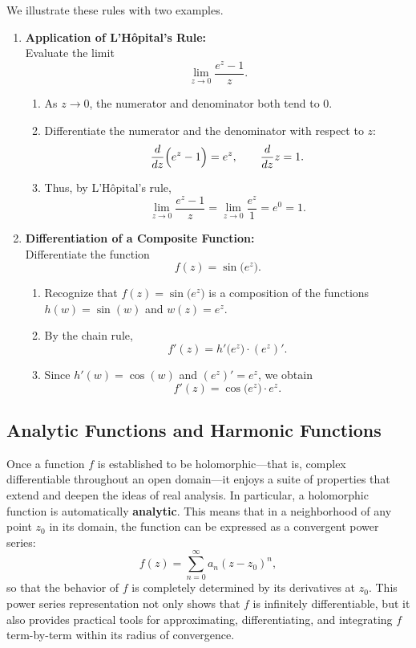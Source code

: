 \exampleline
\begin{example}
We illustrate these rules with two examples.

\begin{enumerate}
    \item \textbf{Application of L'Hôpital's Rule:}\\[1mm]
    Evaluate the limit 
    \[
    \lim_{z\to 0}\frac{e^z-1}{z}.
    \]
    \begin{enumerate}
        \item As \(z\to0\), the numerator and denominator both tend to 0.
        \item Differentiate the numerator and the denominator with respect to \(z\):
        \[
        \frac{d}{dz}\Bigl(e^z-1\Bigr)=e^z,\qquad \frac{d}{dz}z=1.
        \]
        \item Thus, by L'Hôpital's rule,
        \[
        \lim_{z\to 0}\frac{e^z-1}{z}=\lim_{z\to0}\frac{e^z}{1}=e^0=1.
        \]
    \end{enumerate}

    \bigskip

    \item \textbf{Differentiation of a Composite Function:}\\[1mm]
    Differentiate the function
    \[
    f(z)=\sin\bigl(e^z\bigr).
    \]
    \begin{enumerate}
        \item Recognize that \(f(z)=\sin\bigl(e^z\bigr)\) is a composition of the functions \(h(w)=\sin(w)\) and \(w(z)=e^z\).
        \item By the chain rule,
        \[
        f'(z)=h'\bigl(e^z\bigr)\cdot (e^z)'.
        \]
        \item Since \(h'(w)=\cos(w)\) and \((e^z)'=e^z\), we obtain
        \[
        f'(z)=\cos\bigl(e^z\bigr)\cdot e^z.
        \]
    \end{enumerate}
\end{enumerate}

\end{example}
\exampleline



\subsection*{Analytic Functions and Harmonic Functions}  

\noindent Once a function \(f\) is established to be holomorphic—that is, complex differentiable throughout an open domain—it enjoys a suite of properties that extend and deepen the ideas of real analysis. In particular, a holomorphic function is automatically \textbf{analytic}. This means that in a neighborhood of any point \(z_0\) in its domain, the function can be expressed as a convergent power series:
\[
f(z)=\sum_{n=0}^{\infty} a_n (z-z_0)^n,
\]
so that the behavior of \(f\) is completely determined by its derivatives at \(z_0\). This power series representation not only shows that \(f\) is infinitely differentiable, but it also provides practical tools for approximating, differentiating, and integrating \(f\) term-by-term within its radius of convergence. \\

